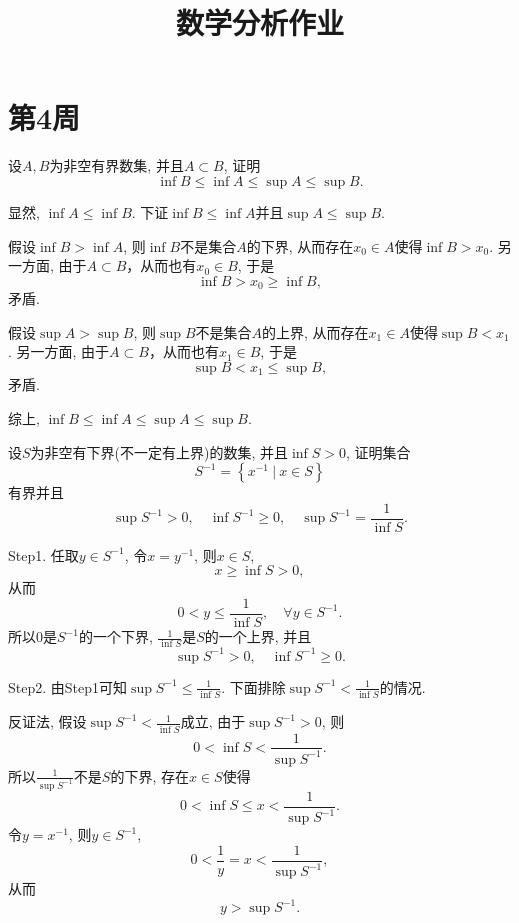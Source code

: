 \documentclass[UTF8,oneside,12pt]{article}  %
\makeatletter
\theoremstyle{DingLi1}
\numberwithin{equation}{section}
\theoremstyle{DingLi2}
\newtheorem{example}{\hskip 2em 问题}[section]
\renewenvironment{proof}[1][\proofname]{\par%
\pushQED{\qed}%
\normalfont \topsep6\p@\@plus6\p@\relax%
\trivlist%
\item[\hskip\labelsep%
#1]\ignorespaces%
}{%
\popQED\endtrivlist\@endpefalse%
}
\renewcommand{\proofname}{\heiti\large\color{blue} 证明}%
\makeatother
\begin{document}
\title{数学分析作业}
\author{}
\date{}
\maketitle

\section{第4周}



\begin{example}
设$A,B$为非空有界数集, 并且$A\subset B$, 证明
   $$\inf B\leq \inf A\leq \sup A\leq \sup B.$$
\end{example}
\begin{proof}
显然, $\inf A\leq \inf B$. 下证$\inf B\leq \inf A$并且$\sup A\leq \sup B$.

假设$\inf B>\inf A$, 则$\inf B$不是集合$A$的下界, 从而存在$x_0\in A$使得$\inf B>x_0$. 另一方面, 由于$A\subset B$，从而也有$x_0\in B$, 于是
$$\inf B>x_0\geq \inf B,$$
矛盾.

假设$\sup A>\sup B$, 则$\sup B$不是集合$A$的上界, 从而存在$x_1\in A$使得$\sup B<x_1$. 另一方面, 由于$A\subset B$，从而也有$x_1\in B$, 于是
$$\sup B<x_1\leq \sup B,$$
矛盾.

综上, $\inf B\leq \inf A\leq \sup A\leq \sup B.$
\end{proof}

\begin{example}
设$S$为非空有下界(不一定有上界)的数集, 并且$\inf S>0$, 证明集合
   $$S^{-1}=\left\{x^{-1}\ |\ x\in S \right\}$$
   有界并且
   $$\sup S^{-1}>0,\quad\inf S^{-1}\geq 0,\quad \sup S^{-1}=\frac{1}{\inf S}.$$
\end{example}
\begin{proof}
Step1. 任取$y\in S^{-1}$, 令$x=y^{-1}$, 则$x\in S$,
$$x\geq \inf S>0,$$
从而
\begin{equation}\label{4.1-1}
0<y\leq \frac{1}{\inf S},\quad \forall y\in S^{-1}.
\end{equation}
所以$0$是$S^{-1}$的一个下界, $\frac{1}{\inf S}$是$S$的一个上界, 并且
$$\sup S^{-1}>0,\quad\inf S^{-1}\geq 0.$$

Step2. 由Step1可知$\sup S^{-1}\leq \frac{1}{\inf S}$. 下面排除$\sup S^{-1}< \frac{1}{\inf S}$的情况.

反证法, 假设$\sup S^{-1}< \frac{1}{\inf S}$成立, 由于$\sup S^{-1}>0$, 则
$$0<\inf S<\frac{1}{\sup S^{-1}}.$$
所以$\frac{1}{\sup S^{-1}}$不是$S$的下界, 存在$x\in S$使得
$$0<\inf S\leq x<\frac{1}{\sup S^{-1}}.$$
令$y=x^{-1}$, 则$y\in S^{-1}$,
$$0<\frac{1}{y}=x<\frac{1}{\sup S^{-1}},$$
从而
$$y>\sup S^{-1}.$$
\end{proof}
\end{document}
